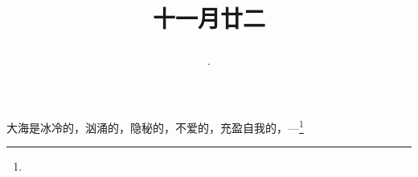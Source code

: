 \title{\date[d=22,m=12,y=2024][year:cn-y,年,month:cn,day:cn,日,·,weekday]·十一月廿二 }
大海是冰冷的，汹涌的，隐秘的，不爱的，充盈自我的，—\footnote{ }

